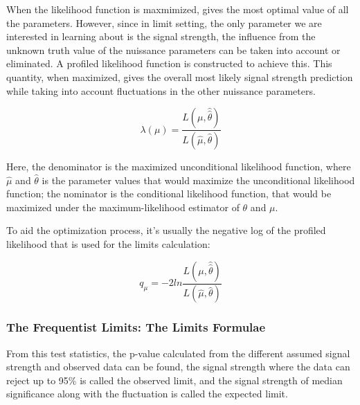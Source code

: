 When the likelihood function is maxmimized, gives the most optimal value of all the parameters. However, since in limit setting, the only parameter we are interested in learning about is the signal strength, the influence from the unknown truth value of the nuissance parameters can be taken into account or eliminated. A profiled likelihood function is constructed to achieve this. This quantity, when maximized, gives the overall most likely signal strength prediction while taking into account fluctuations in the other nuissance parameters. 

\begin{equation}
\lambda(\mu) = \frac{L(\mu, \hat{\hat{\theta}})}{L(\hat{\mu}, \hat{\theta})}
\label{eq:profilelikelihood}
\end{equation}

Here, the denominator is the maximized unconditional likelihood function, where $\hat{\mu}$ and $\hat{\theta}$ is the parameter values that would maximize the unconditional likelihood function; the nominator is the conditional likelihood function, that would be maximized under the maximum-likelihood estimator of $\theta$ and $\mu$. 

To aid the optimization process, it's usually the negative log of the profiled likelihood that is used for the limits calculation:

\begin{equation}
    q_{\mu} = -2 ln \frac{L(\mu, \hat{\hat{\theta}})}{L(\hat{\mu}, \hat{\theta})}
\label{teststats}
\end{equation}


\subsubsection{The Frequentist Limits: The Limits Formulae}
\label{sec:limits}

From this test statistics, the p-value calculated from the different assumed signal strength and observed data can be found, the signal strength where the data can reject up to 95\% is called the observed limit, and the signal strength of median significance along with the fluctuation is called the expected limit. 

